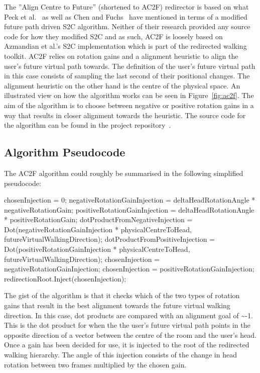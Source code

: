The ''Align Centre to Future'' (shortened to AC2F) redirector is based on what Peck et al.~\cite{peck2010improved} as well as Chen and Fuchs~\cite{chen2017towards, chen2017supporting} have mentioned in terms of a modified future path driven S2C algorithm. Neither of their research provided any source code for how they modified S2C and as such, AC2F is loosely based on Azmandian et al.'s S2C implementation which is part of the redirected walking toolkit. AC2F relies on rotation gains and a alignment heuristic to align the user's future virtual path towards. The definition of the user's future virtual path in this case consists of sampling the last second of their positional changes. The alignment heuristic on the other hand is the centre of the physical space. An illustrated view on how the algorithm works can be seen in Figure~\ref{fig:ac2f}. The aim of the algorithm is to choose between negative or positive rotation gains in a way that results in closer alignment towards the heuristic. The source code for the algorithm can be found in the project repository~\cite{ac2fScript}.

\subsection{Algorithm Pseudocode}
The AC2F algorithm could roughly be summarised in the following simplified pseudocode:
\begin{algorithmic}
\State chosenInjection = 0; 
    \State negativeRotationGainInjection = deltaHeadRotationAngle * negativeRotationGain;
    \State positiveRotationGainInjection = deltaHeadRotationAngle * positiveRotationGain;
    \State dotProductFromNegativeInjection = Dot(negativeRotationGainInjection * physicalCentreToHead, futureVirtualWalkingDirection);
    \State dotProductFromPositiveInjection = Dot(positiveRotationGainInjection * physicalCentreToHead, futureVirtualWalkingDirection);
        \State chosenInjection = negativeRotationGainInjection;
    \Else
        \State chosenInjection = positiveRotationGainInjection;
    \EndIf
\EndIf
\State redirectionRoot.Inject(chosenInjection);
\end{algorithmic}
The gist of the algorithm is that it checks which of the two types of rotation gains that result in the best alignment towards the future virtual walking direction. In this case, dot products are compared with an alignment goal of \textasciitilde-1. This is the dot product for when the the user's future virtual path points in the opposite direction of a vector between the centre of the room and the user's head. Once a gain has been decided for use, it is injected to the root of the redirected walking hierarchy. The angle of this injection consists of the change in head rotation between two frames multiplied by the chosen gain.

